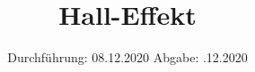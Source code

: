 

\subject{V311}
\title{Hall-Effekt}
\date{%
  Durchführung: 08.12.2020
  \hspace{3em}
  Abgabe: .12.2020
}



\maketitle
\thispagestyle{empty}
\tableofcontents
\newpage







\printbibliography{}


